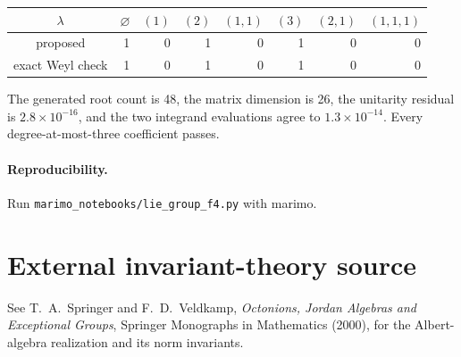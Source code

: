 \documentclass[10pt]{article}
\begin{document}
\begin{center}\small
\begin{tabular}{@{}c|rrrrrrr@{}}\toprule
$\lambda$&$\varnothing$&$(1)$&$(2)$&$(1,1)$&$(3)$&$(2,1)$&$(1,1,1)$\\\midrule
proposed&1&0&1&0&1&0&0\\
exact Weyl check&1&0&1&0&1&0&0\\\bottomrule
\end{tabular}
\end{center}
The generated root count is 48, the matrix dimension is 26, the unitarity
residual is $2.8\times10^{-16}$, and the two integrand evaluations agree to
$1.3\times10^{-14}$.  Every degree-at-most-three coefficient passes.

\paragraph{Reproducibility.} Run \texttt{marimo\_notebooks/lie\_group\_f4.py} with marimo.
\section*{External invariant-theory source}
See T.~A.~Springer and F.~D.~Veldkamp, \emph{Octonions, Jordan Algebras and
Exceptional Groups}, Springer Monographs in Mathematics (2000), for the
Albert-algebra realization and its norm invariants.
\end{document}
